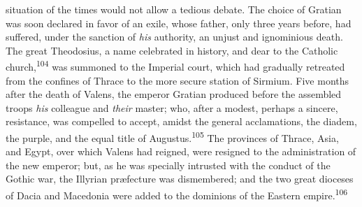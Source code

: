 situation of the times would not allow a tedious debate. The
choice of Gratian was soon declared in favor of an exile, whose
father, only three years before, had suffered, under the sanction
of \textit{his} authority, an unjust and ignominious death. The great
Theodosius, a name celebrated in history, and dear to the
Catholic church,\textsuperscript{104} was summoned to the Imperial court, which
had gradually retreated from the confines of Thrace to the more
secure station of Sirmium. Five months after the death of Valens,
the emperor Gratian produced before the assembled troops \textit{his}
colleague and \textit{their} master; who, after a modest, perhaps a
sincere, resistance, was compelled to accept, amidst the general
acclamations, the diadem, the purple, and the equal title of
Augustus.\textsuperscript{105} The provinces of Thrace, Asia, and Egypt, over
which Valens had reigned, were resigned to the administration of
the new emperor; but, as he was specially intrusted with the
conduct of the Gothic war, the Illyrian præfecture was
dismembered; and the two great dioceses of Dacia and Macedonia
were added to the dominions of the Eastern empire.\textsuperscript{106}




